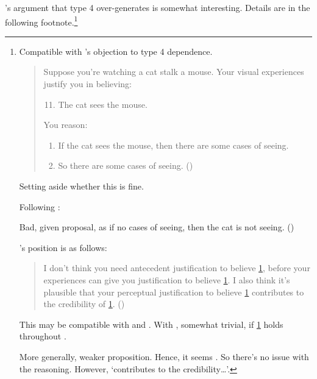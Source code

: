 \begin{note}
  \citeauthor{Pryor:2004ws}'s argument that type 4 over-generates is somewhat interesting.
  Details are in the following footnote.\footnote{
  Compatible with \citeauthor{Pryor:2004ws}'s objection to type 4 dependence.

    \begin{quote}
      Suppose you're watching a cat stalk a mouse. Your visual experiences justify you in believing:

      \begin{enumerate}[label=(\arabic*), ref=(\arabic*)]
        \setcounter{enumi}{10}
      \item
        \label{illu:Pryor:cat:1}
        The cat sees the mouse.
      \end{enumerate}

      You reason:

      \begin{enumerate}[label=(\arabic*), ref=(\arabic*), resume]
      \item
        \label{illu:Pryor:cat:2}
        If the cat sees the mouse, then there are some cases of seeing.
      \item
        \label{illu:Pryor:cat:3}
        So there are some cases of seeing.\nolinebreak
        \mbox{}\hfill\mbox{(\citeyear[361]{Pryor:2004ws})}
      \end{enumerate}
    \end{quote}

  Setting aside whether this is fine.

  Following \citeauthor{Pryor:2004ws}:

  Bad, given proposal, as if no cases of seeing, then the cat is not seeing. (\citeyear[361]{Pryor:2004ws})

  \citeauthor{Pryor:2004ws}'s position is as follows:

  \begin{quote}
    I don't think you need antecedent justification to believe \ref{illu:Pryor:cat:3}, before your experiences can give you justification to believe \ref{illu:Pryor:cat:1}.
    I also think it's plausible that your perceptual justification to believe \ref{illu:Pryor:cat:1} contributes to the credibility of \ref{illu:Pryor:cat:3}.\nolinebreak
    \mbox{}\hfill\mbox{(\citeyear[361]{Pryor:2004ws})}
  \end{quote}

  This may be compatible with \ideaS{} and \ideaCS{}.
  With \ideaCS{}, somewhat trivial, if \ref{illu:Pryor:cat:3} holds throughout .

  More generally, weaker proposition.
  Hence, it seems .
  So there's no issue with the reasoning.
  However, `contributes to the credibility\dots'.
  }
\end{note}

